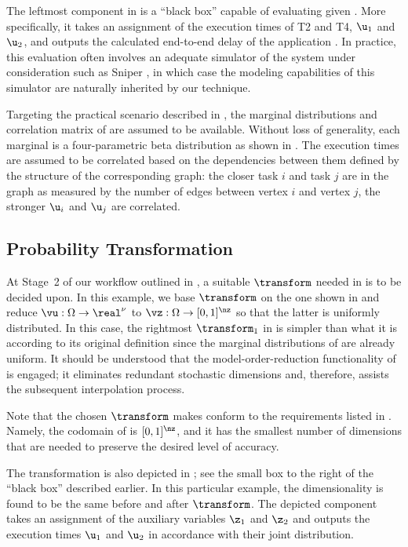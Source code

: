 The leftmost component in  is a ``black box'' capable of
evaluating \g given \vu. More specifically, it takes an assignment of the
execution times of T2 and T4, $\u_1$ and $\u_2$, and outputs the calculated
end-to-end delay of the application \g. In practice, this evaluation often
involves an adequate simulator of the system under consideration such as Sniper
\cite{carlson2011}, in which case the modeling capabilities of this simulator
are naturally inherited by our technique.

Targeting the practical scenario described in , the
marginal distributions and correlation matrix of \vu are assumed to be
available. Without loss of generality, each marginal is a four-parametric beta
distribution as shown in . The execution times are
assumed to be correlated based on the dependencies between them defined by the
structure of the corresponding graph: the closer task $i$ and task $j$ are in
the graph as measured by the number of edges between vertex $i$ and vertex $j$,
the stronger $\u_i$ and $\u_j$ are correlated.

\subsection{Probability Transformation}

At Stage~2 of our workflow outlined in , a suitable
$\transform$ needed in  is to be decided upon.
In this example, we base $\transform$ on the one shown in
 and reduce $\vu: \Omega \to \real^\nu$ to
$\vz: \Omega \to [0, 1]^\nz$ so that the latter is uniformly distributed. In
this case, the rightmost $\transform_1$ in  is
simpler than what it is according to its original definition since the marginal
distributions of \vz are already uniform. It should be understood that the
model-order-reduction functionality of  is
engaged; it eliminates redundant stochastic dimensions and, therefore, assists
the subsequent interpolation process.

Note that the chosen $\transform$ makes \vz conform to the requirements listed
in . Namely, the codomain of \vz is $[0,
1]^\nz$, and it has the smallest number of dimensions that are needed to
preserve the desired level of accuracy.

The transformation is also depicted in ; see the small
box to the right of the ``black box'' described earlier. In this particular
example, the dimensionality is found to be the same before and after
$\transform$. The depicted component takes an assignment of the auxiliary
variables $\z_1$ and $\z_2$ and outputs the execution times $\u_1$ and $\u_2$ in
accordance with their joint distribution.


